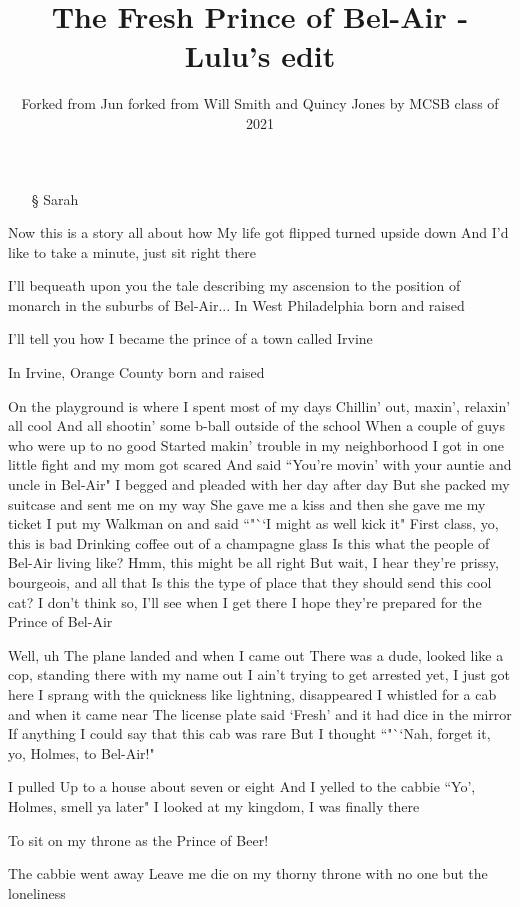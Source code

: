 \documentclass{article}
\title{The Fresh Prince of Bel-Air - Lulu's edit}
\author{Forked from Jun forked from Will Smith and Quincy Jones by MCSB class of 2021}
\begin{document}
\maketitle
\begin{itemize}
\item[\S] Sarah
\end{itemize}

Now this is a story all about how
My life got flipped turned upside down
And I'd like to take a minute, just sit right there


I'll bequeath upon you the tale describing my ascension to the position of monarch in the suburbs of Bel-Air...
In West Philadelphia born and raised

I'll tell you how I became the prince of a town called Irvine


In Irvine, Orange County born and raised

On the playground is where I spent most of my days
Chillin' out, maxin', relaxin' all cool
And all shootin' some b-ball outside of the school
When a couple of guys who were up to no good
Started makin' trouble in my neighborhood
I got in one little fight and my mom got scared
And said ``You're movin' with your auntie and uncle in Bel-Air"
I begged and pleaded with her day after day
But she packed my suitcase and sent me on my way
She gave me a kiss and then she gave me my ticket
I put my Walkman on and said ``"``I might as well kick it"
First class, yo, this is bad
Drinking coffee out of a champagne glass
Is this what the people of Bel-Air living like?
Hmm, this might be all right
But wait, I hear they're prissy, bourgeois, and all that
Is this the type of place that they should send this cool cat?
I don't think so, I'll see when I get there
I hope they're prepared for the Prince of Bel-Air

Well, uh
The plane landed and when I came out
There was a dude, looked like a cop, standing there with my name out
I ain't trying to get arrested yet, I just got here
I sprang with the quickness like lightning, disappeared
I whistled for a cab and when it came near
The license plate said `Fresh' and it had dice in the mirror
If anything I could say that this cab was rare
But I thought ``"``Nah, forget it, yo, Holmes, to Bel-Air!"

I pulled
Up to a house about seven or eight
And I yelled to the cabbie ``Yo', Holmes, smell ya later"
I looked at my kingdom, I was finally there

To sit on my throne as the Prince of Beer!


The cabbie went away
Leave me die on my thorny throne
with no one but the loneliness
\end{document}
